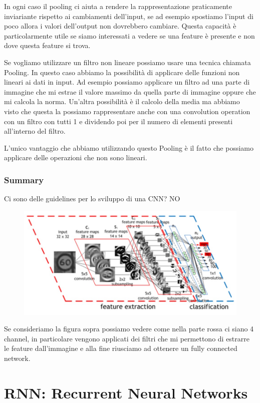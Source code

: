 \documentclass[14pt]{extreport}
\begin{document}
In ogni caso il pooling ci aiuta a rendere la rappresentazione praticamente inviariante rispetto ai cambiamenti dell'input, se ad esempio spostiamo l'input di poco allora
i valori dell'output non dovrebbero cambiare. Questa capacità è particolarmente utile se siamo interessati a vedere se una feature è presente e non dove questa feature si trova.


Se vogliamo utilizzare un filtro non lineare possiamo usare una tecnica chiamata Pooling. In questo caso abbiamo la possibilità di applicare delle
funzioni non lineari ai dati in input. Ad esempio possiamo applicare un filtro ad una parte di immagine che mi estrae il valore massimo da quella
parte di immagine oppure che mi calcola la norma. Un'altra possibilità è il calcolo della media ma abbiamo visto che questa la possiamo rappresentare
anche con una convolution operation con un filtro con tutti 1 e dividendo poi per il numero di elementi presenti all'interno del filtro.

L'unico vantaggio che abbiamo utilizzando questo Pooling è il fatto che possiamo applicare delle operazioni che non sono lineari.

\subsubsection{Summary}

Ci sono delle guidelines per lo sviluppo di una CNN? NO

\begin{figure}[H]
\centering
\includegraphics[width=0.7\linewidth]{407.jpeg}
\end{figure}

Se consideriamo la figura sopra possiamo vedere come nella parte rossa ci siano 4 channel, in particolare vengono applicati dei filtri che mi
permettono di estrarre le feature dall'immagine e alla fine riusciamo ad ottenere un fully connected network.

\section{RNN: Recurrent Neural Networks}
\end{document}
